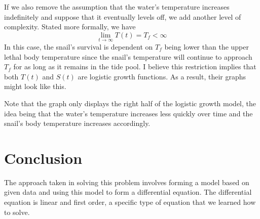 \documentclass{article}
\begin{document}
   If we also remove the assumption that the water's temperature increases indefinitely and suppose that it eventually levels off, we add another level of complexity.
   Stated more formally, we have
   \begin{equation*}
     \lim_{t \to \infty} T(t) = T_{f} < \infty
   \end{equation*}
   In this case, the snail's survival is dependent on \(T_{f}\) being lower than the upper lethal body temperature since the snail's temperature will continue to approach \(T_{f}\) for as long as it remains in the tide pool.
   I believe this restriction implies that both \(T(t)\) and \(S(t)\) are logistic growth functions.
   As a result, their graphs might look like this.
   \begin{center}
   \end{center}
   Note that the graph only displays the right half of the logistic growth model, the idea being that the water's temperature increases less quickly over time and the snail's body temperature increases accordingly.

   \section{Conclusion}
   The approach taken in solving this problem involves forming a model based on given data and using this model to form a differential equation.
   The differential equation is linear and first order, a specific type of equation that we learned how to solve.
\end{document}
